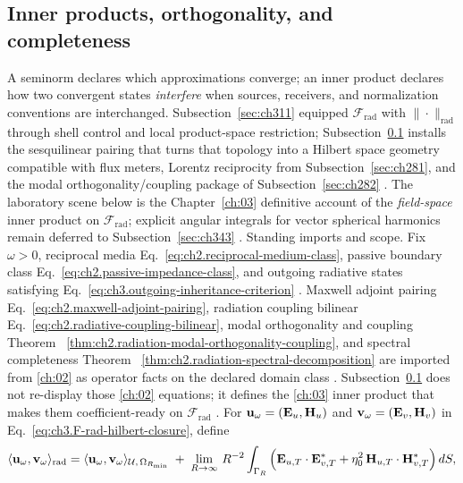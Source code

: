 \subsection{Inner products, orthogonality, and completeness}
\label{sec:ch312}
A seminorm declares which approximations converge; an inner product declares how two convergent states
\emph{interfere} when sources, receivers, and normalization conventions are interchanged. Subsection~\ref{sec:ch311}
equipped \(\mathcal{F}_{\mathrm{rad}}\) with \(\|\cdot\|_{\mathrm{rad}}\) through shell control and local
product-space restriction; Subsection~\ref{sec:ch312} installs the sesquilinear pairing that turns that topology
into a Hilbert space geometry compatible with flux meters, Lorentz reciprocity from
Subsection~\ref{sec:ch281}, and the modal orthogonality/coupling package of
Subsection~\ref{sec:ch282} \cite{stratton1941}. The laboratory scene below is the Chapter~\ref{ch:03}
definitive account of the \emph{field-space} inner product on \(\mathcal{F}_{\mathrm{rad}}\); explicit angular
integrals for vector spherical harmonics remain deferred to Subsection~\ref{sec:ch343}
\cite{hansen1988}.
Standing imports and scope. Fix \(\omega>0\), reciprocal media Eq.~\eqref{eq:ch2.reciprocal-medium-class}, passive boundary class
Eq.~\eqref{eq:ch2.passive-impedance-class}, and outgoing radiative states satisfying
Eq.~\eqref{eq:ch3.outgoing-inheritance-criterion} \cite{stratton1941}. Maxwell adjoint pairing
Eq.~\eqref{eq:ch2.maxwell-adjoint-pairing}, radiation coupling bilinear
Eq.~\eqref{eq:ch2.radiative-coupling-bilinear}, modal orthogonality and coupling Theorem
~\ref{thm:ch2.radiation-modal-orthogonality-coupling}, and spectral completeness Theorem
~\ref{thm:ch2.radiation-spectral-decomposition} are imported from \ref{ch:02} as operator facts on
the declared domain class \cite{stratton1941}. Subsection~\ref{sec:ch312} does not re-display
those \ref{ch:02} equations; it defines the \ref{ch:03} inner product that makes them
coefficient-ready on \(\mathcal{F}_{\mathrm{rad}}\) \cite{stratton1941}.
For \(\mathbf{u}_\omega=(\mathbf{E}_u,\mathbf{H}_u)\) and \(\mathbf{v}_\omega=(\mathbf{E}_v,\mathbf{H}_v)\) in
Eq.~\eqref{eq:ch3.F-rad-hilbert-closure}, define
\begin{equation}
\label{eq:ch3.radiative-inner-product-def}
\langle \mathbf{u}_\omega,\mathbf{v}_\omega\rangle_{\mathrm{rad}}
=
\langle \mathbf{u}_\omega,\mathbf{v}_\omega\rangle_{\mathcal{U},\,\Omega_{R_{\min}}}
\;+\;
\lim_{R\to\infty}\,
R^{-2}
\int_{\Gamma_R}
\Big(
\mathbf{E}_{u,T}\cdot\mathbf{E}_{v,T}^{*}
+\eta_0^{2}\,\mathbf{H}_{u,T}\cdot\mathbf{H}_{v,T}^{*}
\Big)\,dS,
\end{equation}
